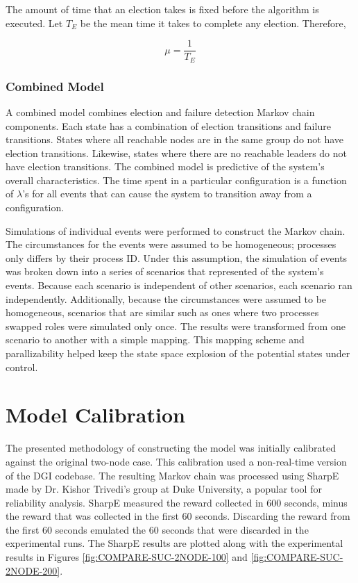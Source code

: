 The amount of time that an election takes is fixed before the algorithm is executed. 
Let $T_{E}$ be the mean time it takes to complete any election. Therefore,

\begin{equation}
\mu = \frac{1}{T_{E}}
\end{equation}

\subsubsection{Combined Model}

A combined model combines election and failure detection Markov chain components.
Each state has a combination of election transitions and failure transitions.
States where all reachable nodes are in the same group do not have election transitions.
Likewise, states where there are no reachable leaders do not have election transitions.                                                        
The combined model is predictive of the system's overall characteristics.
The time spent in a particular configuration is a function of $\lambda$'s for all events that can cause the system to transition away from a configuration. 

Simulations of individual events were performed to construct the Markov chain.
The circumstances for the events were assumed to be homogeneous; processes only differs by their process ID.
Under this assumption, the simulation of events was broken down into a series of scenarios that represented of the system's events.
Because each scenario is independent of other scenarios, each scenario ran independently.
Additionally, because the circumstances were assumed to be homogeneous, scenarios that are similar such as ones where two processes swapped roles were simulated only once. 
The results were transformed from one scenario to another with a simple mapping.
This mapping scheme and parallizability helped keep the state space explosion of the potential states under control.

\section{Model Calibration}

The presented methodology of constructing the model was initially calibrated against the original two-node case.
This calibration used a non-real-time version of the DGI codebase.
The resulting Markov chain was processed using SharpE \cite{SHARPE}\cite{SHARPE2} made by Dr. Kishor Trivedi's group at Duke University, a popular tool for reliability analysis.
SharpE measured the reward collected in 600 seconds, minus the reward that was collected in the first 60 seconds. 
Discarding the reward from the first 60 seconds emulated the 60 seconds that were discarded in the experimental runs.
The SharpE results are plotted along with the experimental results in Figures \ref{fig:COMPARE-SUC-2NODE-100} and \ref{fig:COMPARE-SUC-2NODE-200}.

